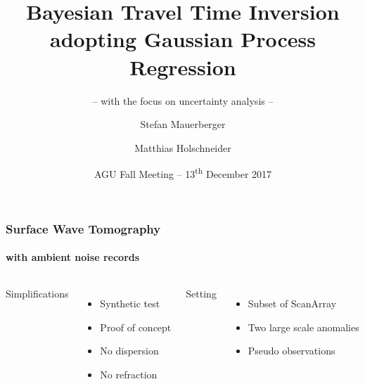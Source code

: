 \documentclass[aspectratio=169, t, 10pt]{beamer}
\title[Correlation based travel time inversion]{Bayesian Travel Time Inversion adopting Gaussian Process Regression}
\subtitle{-- with the focus on uncertainty analysis --}
\author[\tt mauerber@uni-potsdam.de]{Stefan Mauerberger \and Matthias Holschneider}
\institute[Math@UP]{University Potsdam, Institute of Mathematics}
\date[AGU~2017]{AGU Fall Meeting -- 13\textsuperscript{th} December 2017}
\begin{document}



\begin{frame}
    \frametitle{Surface Wave Tomography}
    \framesubtitle{with ambient noise records}

\begin{columns}

    Simplifications
    \begin{itemize}
        \item Synthetic test
        \item Proof of concept
        \item No dispersion
        \item No refraction
    \end{itemize}

    Setting
    \begin{itemize}
        \item Subset of ScanArray \SFWnst
        \item Two large scale anomalies
        \item Pseudo observations
    \end{itemize}


    \vspace{-10mm}
    
\end{columns}

\end{frame}
\end{document}
